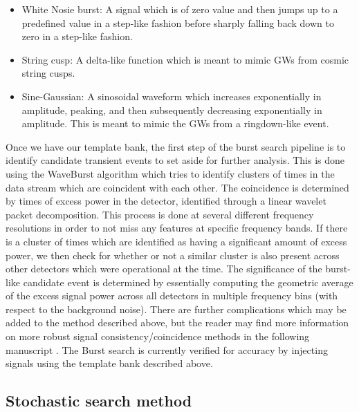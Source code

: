 \begin{itemize}
    \item White Nosie burst: A signal which is of zero value and then jumps up to a predefined value in a step-like fashion before sharply falling back down to zero in a step-like fashion.
    \item String cusp: A delta-like function which is meant to mimic \ac{GW}s from cosmic string cusps.
    \item Sine-Gaussian: A sinosoidal waveform which increases exponentially in amplitude, peaking, and then subsequently decreasing exponentially in amplitude. This is meant to mimic the \ac{GW}s from a ringdown-like event.
\end{itemize}

%
%

Once we have our template bank, the first step of the burst search pipeline is to identify candidate transient events to set aside for further analysis. This is done using the WaveBurst algorithm which tries to identify clusters of times in the data stream which are coincident with each other. The coincidence is determined by times of excess power in the detector, identified through a linear wavelet packet decomposition. This process is done at several different frequency resolutions in order to not miss any features at specific frequency bands. If there is a cluster of times which are identified as having a significant amount of excess power, we then check for whether or not a similar cluster is also present across other detectors which were operational at the time. The significance of the burst-like candidate event is determined by essentially computing the geometric average of the excess signal power across all detectors in multiple frequency bins (with respect to the background noise). There are further complications which may be added to the method described above, but the reader may find more information on more robust signal consistency/coincidence methods in the following manuscript \cite{Abbott_2007}. The Burst search is currently verified for accuracy by injecting signals using the template bank described above.

\subsection{Stochastic search method}

